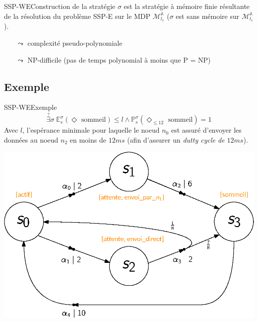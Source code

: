 \documentclass[compress]{beamer}
\begin{document}
\begin{frame}{SSP-WE}{Construction de la stratégie}
  $\sigma$ est la stratégie à mémoire finie résultante de la résolution du problème SSP-E sur le MDP $\mathcal{M}_{l_1}^\mathbb{A}$ ($\sigma$ est sans mémoire sur $\mathcal{M}_{l_1}^\mathbb{A}$).
  \begin{itemize}
    \item[$\leadsto$] complexité pseudo-polynomiale
    \item[$\leadsto$] NP-difficile (pas de temps polynomial à moins que P = NP)
  \end{itemize}
\end{frame}

\subsection{Exemple}
\begin{frame}{SSP-WE}{Exemple}
    \[ \overset{?}{\exists} \sigma \; \mathbb{E}^{\sigma}_s(\Diamond \text{ sommeil}) \leq l \wedge \mathbb{P}^\sigma_s(\Diamond_{\leq 12} \text{ sommeil}) = 1 \]
    {\footnotesize Avec $l$, l'espérance minimale pour laquelle le noeud $n_0$ est assuré d'envoyer les données au noeud $n_2$ en moins de $12 ms$ (afin d'assurer un \textit{dutty cycle de $12 ms$}).}
    \begin{center}
      \includegraphics[width=0.6\linewidth]{resources/main-mdp3}
    \end{center}
\end{frame}
\end{document}
